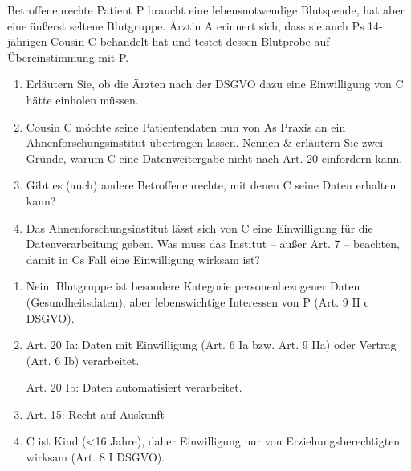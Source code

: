 \documentclass{article}
\begin{document}
\begin{exercise}{Betroffenenrechte}
  Patient P braucht eine lebensnotwendige Blutspende, hat aber eine äußerst seltene Blutgruppe. Ärztin A erinnert sich, dass sie auch Ps 14-jährigen Cousin C behandelt hat und testet dessen Blutprobe auf Übereinstimmung mit P.
  \begin{enumerate}
    \item Erläutern Sie, ob die Ärzten nach der DSGVO dazu eine Einwilligung von C hätte einholen müssen.
    \item Cousin C möchte seine Patientendaten nun von As Praxis an ein Ahnenforschungsinstitut übertragen lassen. Nennen \& erläutern Sie zwei Gründe, warum C eine Datenweitergabe nicht nach Art. 20 einfordern kann.
    \item Gibt es (auch) andere Betroffenenrechte, mit denen C seine Daten erhalten kann?
    \item Das Ahnenforschungsinstitut lässt sich von C eine Einwilligung für die Datenverarbeitung geben. Was muss das Institut – außer Art. 7 – beachten, damit in Cs Fall eine Einwilligung wirksam ist?
  \end{enumerate}

  \begin{solution}
    \begin{enumerate}
      \item Nein. Blutgruppe ist besondere Kategorie personenbezogener Daten (Gesundheitsdaten), aber lebenswichtige Interessen von P (Art. 9 II c DSGVO).
      \item Art. 20 Ia: Daten mit Einwilligung (Art. 6 Ia bzw. Art. 9 IIa) oder Vertrag (Art. 6 Ib) verarbeitet.\xmark\par
            Art. 20 Ib: Daten automatisiert verarbeitet. \xmark
      \item Art. 15: Recht auf Auskunft
      \item C ist Kind (<16 Jahre), daher Einwilligung nur von Erziehungsberechtigten wirksam (Art. 8 I DSGVO).
    \end{enumerate}
  \end{solution}
\end{exercise}
\end{document}
